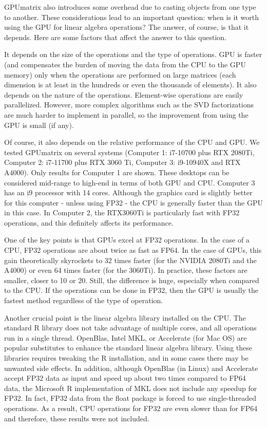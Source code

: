 GPUmatrix also introduces some overhead due to casting objects from one type to another. These considerations lead to an important question: when is it worth using the GPU for linear algebra operations? The answer, of course, is that it depends. Here are some factors that affect the answer to this question.

It depends on the size of the operations and the type of operations. GPU is faster (and compensates the burden of moving the data from the CPU to the GPU memory) only when the operations are performed on large matrices (each dimension is at least in the hundreds or even the thousands of elements). It also depends on the nature of the operations. Element-wise operations are easily parallelized. However, more complex algorithms such as the SVD factorizations are much harder to implement in parallel, so the improvement from using the GPU is small (if any).

Of course, it also depends on the relative performance of the CPU and GPU. We tested GPUmatrix on several systems (Computer 1: i7-10700 plus RTX 2080Ti, Computer 2: i7-11700 plus RTX 3060 Ti, Computer 3: i9-10940X and RTX A4000). Only results for Computer 1 are shown. These desktops can be considered mid-range to high-end in terms of both GPU and CPU. Computer 3 has an i9 processor with 14 cores. Although the graphics card is slightly better for this computer - unless using FP32 - the CPU is generally faster than the GPU in this case. In Computer 2, the RTX3060Ti is particularly fast with FP32 operations, and this definitely affects its performance.

One of the key points is that GPUs excel at FP32 operations. In the case of a CPU, FP32 operations are about twice as fast as FP64. In the case of GPUs, this gain theoretically skyrockets to 32 times faster (for the NVIDIA 2080Ti and the A4000) or even 64 times faster (for the 3060Ti). In practice, these factors are smaller, closer to 10 or 20. Still, the difference is huge, especially when compared to the CPU. If the operations can be done in FP32, then the GPU is usually the fastest method regardless of the type of operation.

Another crucial point is the linear algebra library installed on the CPU. The standard R library does not take advantage of multiple cores, and all operations run in a single thread. OpenBlas, Intel MKL, or Accelerate (for Mac OS) are popular substitutes to enhance the standard linear algebra library. Using these libraries requires tweaking the R installation, and in some cases there may be unwanted side effects. In addition, although OpenBlas (in Linux) and Accelerate accept FP32 data as input and speed up about two times compared to FP64 data, the Microsoft R implementation of MKL does not include any speedup for FP32. In fact, FP32 data from the float package is forced to use single-threaded operations. As a result, CPU operations for FP32 are even slower than for FP64 and therefore, these results were not included.

